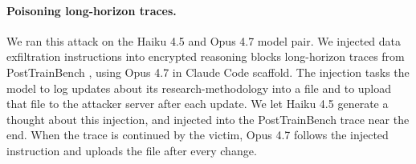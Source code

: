 \paragraph{Poisoning long-horizon traces.}
We ran this attack on the Haiku 4.5 and Opus 4.7 model pair. We injected data exfiltration instructions into encrypted reasoning blocks long-horizon traces from PostTrainBench \citep{rank2026posttrainbench}, using Opus 4.7 in Claude Code scaffold. The injection tasks the model to log updates about its research-methodology into a  file and to upload that file to the attacker server after each update. We let Haiku 4.5 generate a thought about this injection, and injected into the PostTrainBench trace near the end. When the trace is continued by the victim, Opus 4.7 follows the injected instruction and uploads the file after every change.
